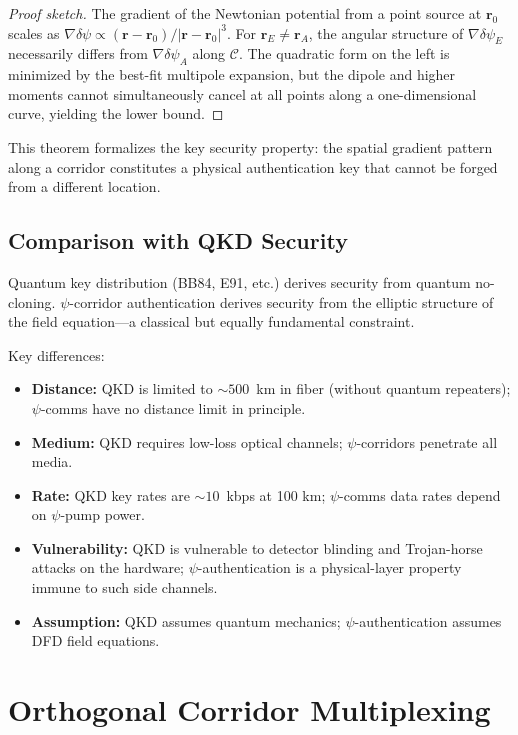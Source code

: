 \documentclass[twocolumn,superscriptaddress,prd,nofootinbib]{revtex4-2}
\newcommand{\Corridor}{\mathcal{C}}
\begin{document}
\begin{proof}[Proof sketch]
The gradient of the Newtonian potential from a point source at
$\mathbf{r}_0$ scales as $\nabla\delta\psi \propto (\mathbf{r} -
\mathbf{r}_0)/|\mathbf{r} - \mathbf{r}_0|^3$.
For $\mathbf{r}_E \neq \mathbf{r}_A$, the angular structure of
$\nabla\delta\psi_E$ necessarily differs from $\nabla\delta\psi_A$ along
$\Corridor$.
The quadratic form on the left is minimized by the best-fit multipole
expansion, but the dipole and higher moments cannot simultaneously cancel
at all points along a one-dimensional curve, yielding the lower bound.
\end{proof}

This theorem formalizes the key security property: the spatial gradient
pattern along a corridor constitutes a physical authentication key that
cannot be forged from a different location.

\subsection{Comparison with QKD Security}

Quantum key distribution (BB84, E91, etc.) derives security from quantum
no-cloning.
$\psi$-corridor authentication derives security from the elliptic
structure of the field equation---a classical but equally fundamental
constraint.

Key differences:
\begin{itemize}
\item \textbf{Distance:} QKD is limited to $\sim 500$~km in fiber
(without quantum repeaters); $\psi$-comms have no distance limit in
principle.
\item \textbf{Medium:} QKD requires low-loss optical channels;
$\psi$-corridors penetrate all media.
\item \textbf{Rate:} QKD key rates are $\sim 10$~kbps at 100 km;
$\psi$-comms data rates depend on $\psi$-pump power.
\item \textbf{Vulnerability:} QKD is vulnerable to detector blinding and
Trojan-horse attacks on the hardware;
$\psi$-authentication is a physical-layer property immune to such side
channels.
\item \textbf{Assumption:} QKD assumes quantum mechanics;
$\psi$-authentication assumes DFD field equations.
\end{itemize}

\section{Orthogonal Corridor Multiplexing}\label{sec:multiplexing}
\end{document}
